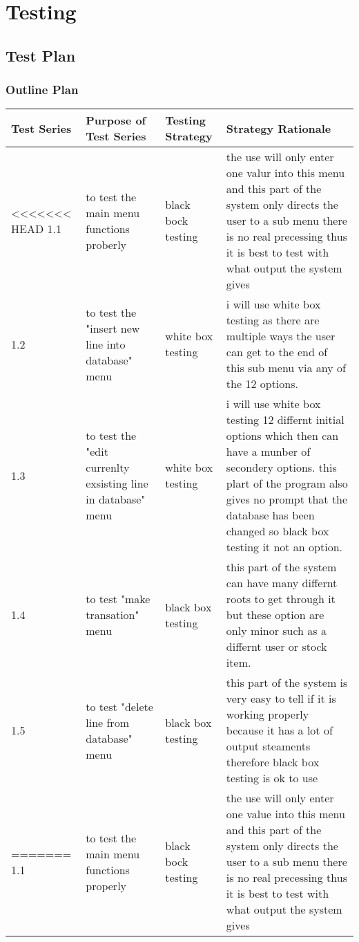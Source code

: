 \chapter{Testing}

\section{Test Plan}

\begin{landscape}

\subsection{Outline Plan}

\begin{center}
    \begin{tabular}{|p{2cm}|p{5cm}|p{5cm}|p{4cm}|}
        \hline
        \textbf{Test Series} & \textbf{Purpose of Test Series} & \textbf{Testing Strategy} & \textbf{Strategy Rationale}\\  \hline
<<<<<<< HEAD
        1.1 & to test the main menu functions proberly  & black bock testing & the use will only enter one valur into this menu and this part of the system only directs the user to a sub menu there is no real precessing thus it is best to test with what output the system gives \\ \hline
1.2 &to test the "insert new line into database" menu & white box testing & i will use white box testing as there are multiple ways the user can get to the end of this sub menu via any of the 12 options.\\ \hline
1.3 & to test the "edit currenlty exsisting line in database" menu & white box testing & i will use white box testing 12 differnt initial options which then can have a munber of secondery options. this plart of the program also gives no prompt that the database has been changed so black box testing it not an option. \\ \hline
1.4 & to test "make transation" menu & black box testing & this part of the system can have many differnt roots to get through it but these option are only minor such as a differnt user or stock item. \\ \hline
1.5 & to test "delete line from database" menu & black box testing & this part of the system is very easy to tell if it is working properly because it has a lot of output steaments therefore black box testing is ok to use \\ \hline
=======
        1.1 & to test the main menu functions properly  & black bock testing & the use will only enter one value into this menu and this part of the system only directs the user to a sub menu there is no real precessing thus it is best to test with what output the system gives \\ \hline

\end{tabular}
\end{center}
\end{landscape}
